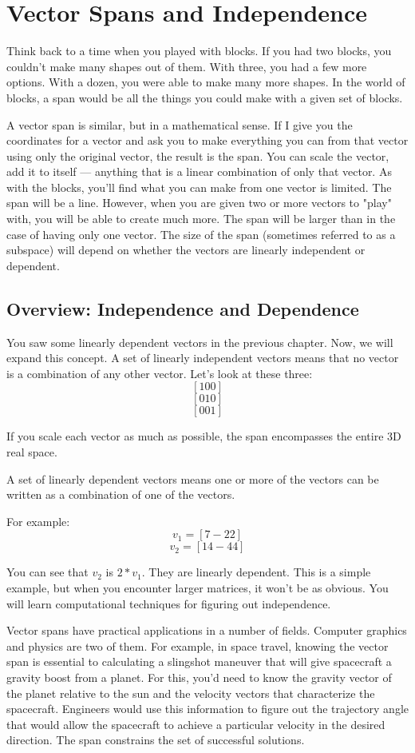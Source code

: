 \chapter{Vector Spans and Independence}
Think back to a time when you played with blocks. If you had two blocks, you 
couldn't make many shapes out of them. With three, you had a few more options. 
With a dozen, you were able to make many more shapes. In the world of blocks, 
a span would be all the things you could make with a given set of blocks. 

A vector span is similar, but in a mathematical sense. If I give you the 
coordinates for a vector and ask you to make everything you can from that 
vector using only the original vector, the result is the span. You can scale 
the vector, add it to itself --- anything that is a linear combination of only 
that vector. As with the blocks, you'll find what you can make from one vector 
is limited. The span will be a line. However, when you are given two or more 
vectors to "play" with, you will be able to create much more. The span will be 
larger than in the case of having only one vector. The size of the span 
(sometimes referred to as a subspace) will depend on whether the vectors are 
linearly independent or dependent. 

\section{Overview: Independence and Dependence}
You saw some linearly dependent vectors in the previous chapter. Now, we will 
expand this concept. A set of linearly independent vectors means that no 
vector is a combination of any other vector. Let's look at these three:
$$[1 0 0]$$
$$[0 1 0]$$
$$[0 0 1]$$

If you scale each vector as much as possible, the span encompasses the entire 
3D real space. 

A set of linearly dependent vectors means one or more of the vectors can be 
written as a combination of one of the vectors.

For example:
$$v_1 = [7 -2 2]$$
$$v_2 = [14 -4 4]$$

You can see that $v_2$ is $2*v_1$. They are linearly dependent. This is a 
simple example, but when you encounter larger matrices, it won't be as obvious. 
You will learn computational techniques for figuring out independence.

Vector spans have practical applications in a number of fields. Computer 
graphics and physics are two of them. For example, in space travel, knowing 
the vector span is essential to calculating a slingshot maneuver that will 
give spacecraft a gravity boost from a planet. For this, you'd need to know 
the gravity vector of the planet relative to the sun and the velocity vectors 
that characterize the spacecraft. Engineers would use this information to 
figure out the trajectory angle that would allow the spacecraft to achieve a 
particular velocity in the desired direction. The span constrains the set of 
successful solutions.

